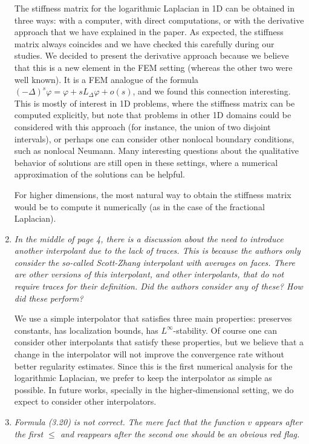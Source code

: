 \documentclass[11 pt]{article}
\numberwithin{equation}{section}
\begin{document}
\begin{enumerate}
The stiffness matrix for the logarithmic Laplacian in 1D can be obtained in three ways: with a computer, with direct computations, or with the derivative approach that we have explained in the paper. As expected, the stiffness matrix always coincides and we have checked this carefully during our studies. We decided to present the derivative approach because we believe that this is a new element in the FEM setting (whereas the other two were well known). It is a FEM analogue of the formula
$(-\Delta)^s\varphi = \varphi + sL_\Delta \varphi + o(s)$, and we found this connection interesting.  This is mostly of interest in 1D problems, where the stiffness matrix can be computed explicitly, but note that problems in other 1D domains could be considered with this approach (for instance, the union of two disjoint intervals), or perhaps one can consider other nonlocal boundary conditions, such as nonlocal Neumann.  Many interesting questions about the qualitative behavior of solutions are still open in these settings, where a numerical approximation of the solutions can be helpful.

For higher dimensions, the most natural way to obtain the stiffness matrix would be to compute it numerically (as in the case of the fractional Laplacian).

    \item \emph{In the middle of page 4, there is a discussion about the need to introduce another interpolant due to the lack of traces. This is because the authors only consider the so-called Scott-Zhang interpolant with averages on faces. There are other versions of this interpolant, and other interpolants, that do not require traces for their definition. Did the authors consider any of these? How did these perform?}

    We use a simple interpolator that satisfies three main properties: preserves constants, has localization bounds, has $L^\infty$-stability. Of course one can consider other interpolants that satisfy these properties, but we believe that a change in the interpolator will not improve the convergence rate without better regularity estimates.  Since this is the first numerical analysis for the logarithmic Laplacian, we prefer to keep the interpolator as simple as possible. In future works, specially in the higher-dimensional setting, we do expect to consider other interpolators.

    \item \emph{Formula (3.20) is not correct. The mere fact that the function \( v \) appears after the first \( \leq \) and reappears after the second one should be an obvious red flag.}


\end{enumerate}
\end{document}
